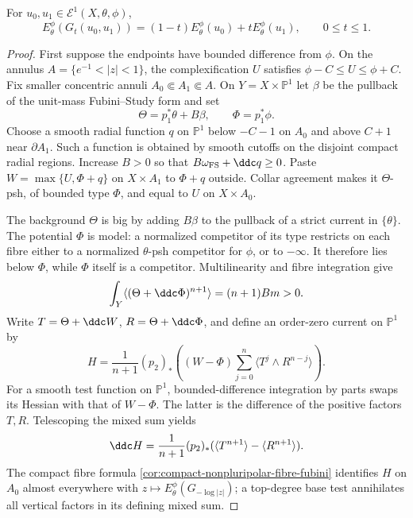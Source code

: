 \begin{theorem}\label{thm:relative-geodesic-energy-affine}
For $u_0,u_1\in\mathcal E^1(X,\theta,\phi)$,
\[
 E_\theta^\phi(G_t(u_0,u_1))
             =(1-t)E_\theta^\phi(u_0)+tE_\theta^\phi(u_1),
                   \qquad0\leq t\leq1.
\]
\end{theorem}
\begin{proof}
First suppose the endpoints have bounded difference from $\phi$. On the annulus $A=\{e^{-1}<|z|<1\}$, the complexification $U$ satisfies $\phi-C\leq U\leq\phi+C$. Fix smaller concentric annuli $A_0\Subset A_1\Subset A$. On $Y=X\times\mathbb P^1$ let $\beta$ be the pullback of the unit-mass Fubini--Study form and set
\[
 \Theta=p_1^*\theta+B\beta,\qquad\Phi=p_1^*\phi.
\]
Choose a smooth radial function $q$ on $\mathbb P^1$ below $-C-1$ on $A_0$ and above $C+1$ near $\partial A_1$. Such a function is obtained by smooth cutoffs on the disjoint compact radial regions. Increase $B>0$ so that $B\omega_{\rm FS}+\ddc q\geq0$. Paste $W=\max\{U,\Phi+q\}$ on $X\times A_1$ to $\Phi+q$ outside. Collar agreement makes it $\Theta$-psh, of bounded type $\Phi$, and equal to $U$ on $X\times A_0$.

The background $\Theta$ is big by adding $B\beta$ to the pullback of a strict current in $\{\theta\}$. The potential $\Phi$ is model: a normalized competitor of its type restricts on each fibre either to a normalized $\theta$-psh competitor for $\phi$, or to $-\infty$. It therefore lies below $\Phi$, while $\Phi$ itself is a competitor. Multilinearity and fibre integration give
\[
 \int_Y\langle(\Theta+\ddc\Phi)^{n+1}\rangle=(n+1)Bm>0.
\]
Write $T=\Theta+\ddc W$, $R=\Theta+\ddc\Phi$, and define an order-zero current on $\mathbb P^1$ by
\[
 H=\frac1{n+1}(p_2)_*
       \left((W-\Phi)\sum_{j=0}^n\langle T^j\wedge R^{n-j}\rangle\right).
\]
For a smooth test function on $\mathbb P^1$, bounded-difference integration by parts swaps its Hessian with that of $W-\Phi$. The latter is the difference of the positive factors $T,R$. Telescoping the mixed sum yields
\begin{equation}\label{eq:relative-geodesic-energy-current-curvature}
 \ddc H=\frac1{n+1}(p_2)_*
                         (\langle T^{n+1}\rangle-\langle R^{n+1}\rangle).
\end{equation}
The compact fibre formula \cref{cor:compact-nonpluripolar-fibre-fubini} identifies $H$ on $A_0$ almost everywhere with $z\mapsto E_\theta^\phi(G_{-\log|z|})$; a top-degree base test annihilates all vertical factors in its defining mixed sum.


\end{proof}
